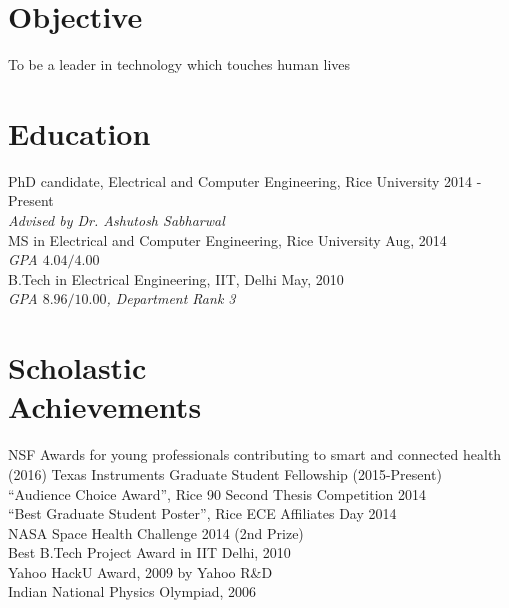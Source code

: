 \documentclass[margin]{res}
\begin{document}
 
 

\address{Rice University \\ ECE Department, MS-380 \\ 6100 Main Street  \\ Houston, TX 77005         }
        
\address{{} \\ \emph{Phone:}     832-593-1893 \\ \emph{Email:}   mk28@rice.edu \\ \emph{Website:}
\url{www.ece.rice.edu/~mk28/}}


 
\begin{resume} 
 
\section{Objective} 
To be a leader in technology which touches human lives  

\section{Education} 
PhD candidate, Electrical and Computer Engineering, Rice University \hfill{2014 - Present} \\
 \emph{Advised by Dr. Ashutosh Sabharwal} \\
MS in Electrical and Computer Engineering, Rice University \hfill{Aug, 2014}  \\
 \emph{GPA $4.04/4.00$} \\
B.Tech in Electrical Engineering, IIT, Delhi \hfill{May, 2010}  \\
 \emph{GPA $8.96 / 10.00$, Department Rank 3}   \\

\vspace{-5mm}
\section{Scholastic \\ Achievements}
NSF Awards for young professionals contributing to smart and connected health (2016) 
Texas Instruments Graduate Student Fellowship (2015-Present) \\
“Audience Choice Award”, Rice 90 Second Thesis Competition 2014  \\
“Best Graduate Student Poster”, Rice ECE Affiliates Day 2014 \\
NASA Space Health Challenge 2014 (2nd Prize)  \\
Best B.Tech Project Award in IIT Delhi, 2010 \\
Yahoo HackU Award, 2009  by Yahoo R\&D \\
Indian National Physics Olympiad, 2006


\end{resume}
\end{document}
